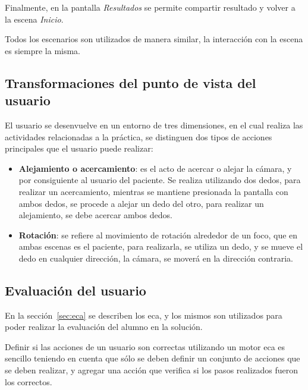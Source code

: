Finalmente, en la pantalla \emph{Resultados} se permite compartir resultado y
volver a la escena \emph{Inicio}.

Todos los escenarios son utilizados de manera similar, la interacción con la
escena es siempre la misma.

\subsection{Transformaciones del punto de vista del usuario}

El usuario se desenvuelve en un entorno de tres dimensiones, en el cual realiza
las actividades relacionadas a la práctica, se distinguen dos tipos de acciones
principales que el usuario puede realizar:

\begin{itemize}
    \item \textbf{Alejamiento o acercamiento}: es el acto de acercar o alejar la
        cámara, y por consiguiente al usuario del paciente. Se realiza
        utilizando dos dedos, para realizar un acercamiento, mientras se
        mantiene presionada la pantalla con ambos dedos, se procede a alejar un
        dedo del otro, para realizar un alejamiento, se debe acercar ambos
        dedos.
    \item \textbf{Rotación}: se refiere al movimiento de rotación alrededor de
        un foco, que en ambas escenas es el paciente, para realizarla, se utiliza
        un dedo, y se mueve el dedo en cualquier dirección, la cámara, se moverá
        en la dirección contraria.
\end{itemize}

\subsection{Evaluación del usuario}
\label{sec:eca_impl}


En la sección~\ref{sec:eca} se describen los \Gls{eca}, y los mismos son
utilizados para poder realizar la evaluación del alumno en la solución.

Definir si las acciones de un usuario son correctas utilizando un motor
\Gls{eca} es sencillo teniendo en cuenta que sólo se deben definir un
conjunto de acciones que se deben realizar, y agregar una acción que verifica si
los pasos realizados fueron los correctos.

